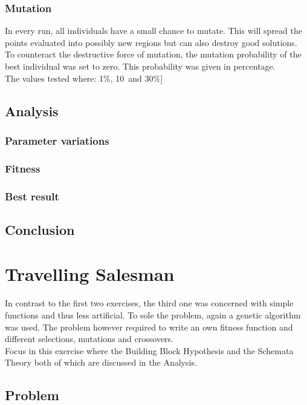 \documentclass{scrartcl}
\begin{document}
\subsubsection{Mutation}
In every run, all individuals have a small chance to mutate. This will spread the points evaluated into possibly new regions but can also destroy good solutions. To counteract the destructive force of mutation, the mutation probability of the best individual was set to zero.
This probability was given in percentage.\\
The values tested where: 1\%, 10\ and 30\%]


\subsection{Analysis}
\subsubsection{Parameter variations}

\subsubsection{Fitness}

\subsubsection{Best result}

\subsection{Conclusion}



\section{Travelling Salesman}
In contrast to the first two exercises, the third one was concerned with simple functions and thus less artificial. To sole the problem, again a genetic algorithm was used. The problem however required to write an own fitness function and different selections, mutations and crossovers.\\
Focus in this exercise where the Building Block Hypothesis and the Schemata Theory both of which are discussed in the Analysis.

\subsection{Problem}
\end{document}
